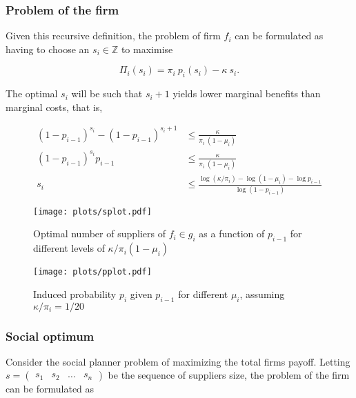 \documentclass[american, abstract=on]{scrartcl}
\begin{document}
\subsubsection{Problem of the firm}

Given this recursive definition, the problem of firm $f_i$ can be formulated as having to choose an $s_i \in \mathbb{Z}$ to maximise

\begin{equation}
  \Pi_i(s_i) = \pi_i \ p_i(s_i) - \kappa \ s_i.
\end{equation}

The optimal $s_i$ will be such that $s_i + 1$ yields lower marginal benefits than marginal costs, that is,

\begin{equation}
  \begin{split}
    (1 - p_{i-1})^{s_i} - (1 - p_{i-1})^{s_i + 1} &\leq \frac{\kappa}{\pi_i \ (1 - \mu_i)} \\
    (1 - p_{i-1})^{s_i} p_{i - 1} &\leq \frac{\kappa}{\pi_i \ (1 - \mu_i)} \\
    s_i&\leq \frac{\log\left( \kappa / \pi_i \right) - \log(1 - \mu_i) - \log p_{i - 1}}{\log(1 - p_{i-1})}
  \end{split}
\end{equation}

\begin{figure}[H]
  \centering
  \texttt{[image: plots/splot.pdf]} 
  \caption{Optimal number of suppliers of $f_i \in g_i$ as a function of $p_{i - 1}$ for different levels of $\kappa \Big/ \pi_i (1 - \mu_i)$}
  \label{fig:splot}
\end{figure}

\begin{figure}[H]
  \centering
  \texttt{[image: plots/pplot.pdf]} 
  \caption{Induced probability $p_i$ given $p_{i - 1}$ for different $\mu_i$, assuming $\kappa / \pi_i = 1/20$}
  \label{fig:pplot}
\end{figure}

\subsubsection{Social optimum}

Consider the social planner problem of maximizing the total firms payoff. Letting $s = \begin{pmatrix} s_1 & s_2 & \ldots & s_n \end{pmatrix}$ be the sequence of suppliers size, the problem of the firm can be formulated as
\end{document}
